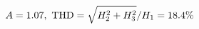 \documentclass[preview]{standalone}
\begin{document}
\begin{align*}
\special{dvisvgm:raw <g id='unique000'>}A=1.07,\ \text{THD}=\sqrt{H_2^2+H_3^2}/H_1=18.4\%\special{dvisvgm:raw </g>}
\end{align*}
\end{document}
